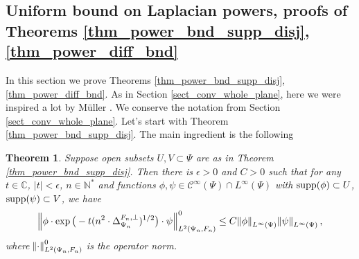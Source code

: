 \documentclass[12pt]{article}
\numberwithin{equation}{section}
\theoremstyle{theorem}
\newtheorem{thm}{Theorem}[section]
\theoremstyle{definition}
\theoremstyle{remark}
\newcommand{\comp}{\mathbb{C}}
\newcommand{\nat}{\mathbb{N}}
\newcommand{\ccal}{\mathscr{C}}
\newcommand{\laplcomp}{\Delta}
\begin{document}
	 
	 
	\subsection{Uniform bound on Laplacian powers, proofs of Theorems \ref{thm_power_bnd_supp_disj}, \ref{thm_power_diff_bnd}}\label{sect_unf_powrs_lapl}
	In this section we prove Theorems \ref{thm_power_bnd_supp_disj}, \ref{thm_power_diff_bnd}.
	As in Section \ref{sect_conv_whole_plane}, here we were inspired a lot by Müller \cite{Mull78}.
	We conserve the notation from Section \ref{sect_conv_whole_plane}.
	Let's start with Theorem \ref{thm_power_bnd_supp_disj}.
	The main ingredient is the following
	\begin{thm}\label{thm_exp_12_bound}
		Suppose open subsets $U ,V \subset \Psi$ are as in Theorem \ref{thm_power_bnd_supp_disj}. 
		Then there is $\epsilon > 0$ and $C > 0$ such that for any $t \in \comp$, $|t| < \epsilon$, $n \in \nat^*$ and functions $\phi, \psi \in \ccal^{\infty}(\Psi) \cap L^{\infty}(\Psi)$ with ${\rm{supp}}(\phi) \subset U$, ${\rm{supp}}(\psi) \subset V$, we have
		\begin{equation}\label{eq_exp_12_bound}
			\Big\| \phi \cdot \exp \big(-t (n^2 \cdot\laplcomp_{\Psi_n}^{F_n, \perp})^{1/2} \big) \cdot \psi \Big\|_{L^2(\Psi_n, F_n)}^{0} \leq C \norm{\phi}_{L^{\infty}(\Psi)} \norm{\psi}_{L^{\infty}(\Psi)},
		\end{equation}
		where $\norm{\cdot}_{L^2(\Psi_n, F_n)}^{0}$ is the operator norm.
	\end{thm}
\end{document}
